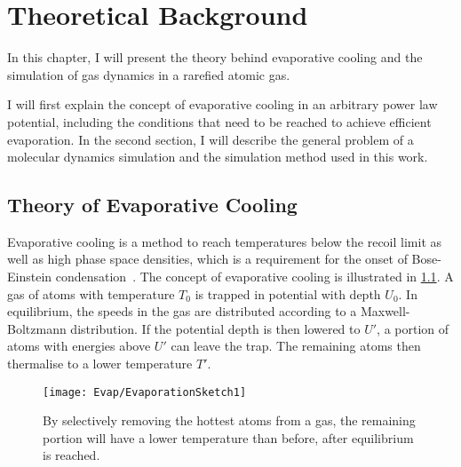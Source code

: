 

\chapter{Theoretical Background}
In this chapter, I will present the theory behind evaporative cooling and the simulation of gas dynamics in a rarefied atomic gas.

I will first explain the concept of evaporative cooling in an arbitrary power law potential, including the conditions that need to be reached to achieve efficient evaporation. In the second section, I will describe the general problem of a molecular dynamics simulation and the simulation method used in this work.

\section{Theory of Evaporative Cooling}
Evaporative cooling is a method to reach temperatures below the recoil limit as well as high phase space densities, which is a requirement for the onset of Bose-Einstein condensation~\cite{pethick_smith_2008}. The concept of evaporative cooling is illustrated in \cref{fig:evaporative_cooling_sketch}. A gas of atoms with temperature $T_0$ is trapped in potential with depth $U_0$. In equilibrium, the speeds in the gas are distributed according to a Maxwell-Boltzmann distribution. If the potential depth is then lowered to $U'$, a portion of atoms with energies above $U'$ can leave the trap. The remaining atoms then thermalise to a lower temperature $T'$. 

\vfill
\begin{figure}[htbp]
    \centering
    \texttt{[image: Evap/EvaporationSketch1]}
    \caption[Concept of evaporative cooling]{By selectively removing the hottest atoms from a gas, the remaining portion will have a lower temperature than before, after equilibrium is reached.}
    \label{fig:evaporative_cooling_sketch}
\end{figure}
\vfill


